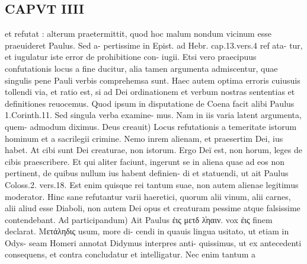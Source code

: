 \documentclass{article}
\begin{document}
\begin{pages}
\section*{CAPVT IIII }
\marginpar{[ p.187 ]}et refutat : alterum praetermittit, quod hoc malum nondum vicinum esse praeuideret Paulus. Sed a- pertissime in Epist. ad Hebr. cap.13.vers.4 ref ata- tur, et iugulatur iste error de prohibitione con- iugii. Etsi vero praecipuus confutationis locus a fine ducitur, alia tamen argumenta admiscentur, quae singulis pene Pauli verbis comprehemsa sunt. Haec autem optima erroris cuiusuis tollendi via, et ratio est, si ad Dei ordinationem et verbum nostras sententias et definitiones reuocemus. Quod ipsum in disputatione de Coena facit alibi Paulus 1.Corinth.11. Sed singula verba examine- mus. Nam in iis varia latent argumenta, quem- admodum diximus. Deus creauit) Locus refutationis a temeritate istorum hominum et a sacrilegii crimine. Nemo inrem alienam, et praesertim Dei, ius habet. At cibi sunt Dei creaturae, non istorum. Ergo Deï est, non horum, leges de cibis praescribere. Et qui aliter faciunt, ingerunt se in aliena quae ad eos non pertinent, de quibus nullum ius habent definien- di et statuendi, ut ait Paulus Coloss.2. vers.18. Est enim quisque rei tantum suae, non autem alienae legitimus moderator. Hinc sane refutantur varii haeretici, quorum alii vinum, alii carnes, alii aliud esse Diaboli, non autem Dei opus et creaturam pessime atque falsissime contendebant. Ad participandum) Ait Paulus ἐις μετδ λ̓ηαιν. vox ἐις finem declarat. Μετάληδις usum, more di- cendi in quauis lingua usitato, ut etiam in Odys- seam Homeri annotat Didymus interpres anti- quissimus, ut ex antecedenti consequens, et contra concludatur et intelligatur. Nec enim tantum a 

\end{pages}
\end{document}
